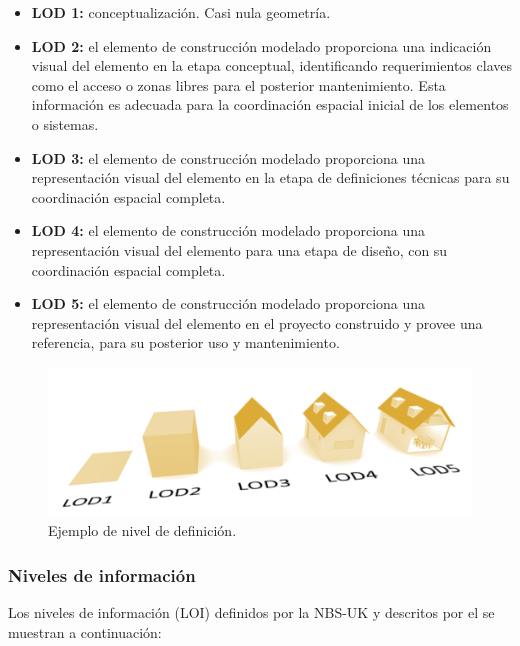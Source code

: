 \begin{itemize}
    \item \textbf{LOD 1:} conceptualización. Casi nula geometría.
    \item \textbf{LOD 2:} el elemento de construcción modelado proporciona una indicación visual del elemento en la etapa conceptual, identificando requerimientos claves como el acceso o zonas libres para el posterior mantenimiento. Esta información es adecuada para la coordinación espacial inicial de los elementos o sistemas.
    \item \textbf{LOD 3:} el elemento de construcción modelado proporciona una representación visual del elemento en la etapa de definiciones técnicas para su coordinación espacial completa.
    \item \textbf{LOD 4:} el elemento de construcción modelado proporciona una representación visual del elemento para una etapa de diseño, con su coordinación espacial completa.
    \item \textbf{LOD 5:} el elemento de construcción modelado proporciona una representación visual del elemento en el proyecto construido y provee una referencia, para su posterior uso y mantenimiento.
\end{itemize}

\begin{figure}[H]
    \centering
    \includegraphics[width=0.65\linewidth]{images/LOD.png}
    \caption{Ejemplo de nivel de definición.}
\end{figure}

\subsubsection{Niveles de información}

Los niveles de información (LOI) definidos por la NBS-UK y descritos por el  se muestran a continuación:

